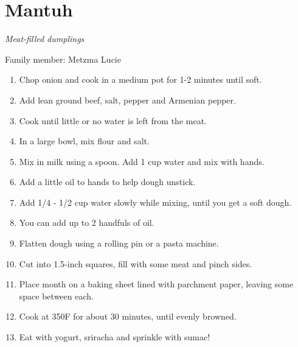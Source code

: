 \chapter{Mantuh}
\label{ch:mantuh}


\textit{Meat-filled dumplings}

Family member: Metzma Lucie

\begin{enumerate}
    \item Chop onion and cook in a medium pot for 1-2 minutes until soft.
    \item Add lean ground beef, salt, pepper and Armenian pepper.
    \item Cook until little or no water is left from the meat.

    \item In a large bowl, mix flour and salt.
    \item Mix in milk using a spoon. Add 1 cup water and mix with hands.
    \item Add a little oil to hands to help dough unstick.
    \item Add 1/4 - 1/2 cup water slowly while mixing, until you get a soft dough.
    \item You can add up to 2 handfuls of oil.

    \item Flatten dough using a rolling pin or a pasta machine.
    \item Cut into 1.5-inch squares, fill with some meat and pinch sides.
    \item Place month on a baking sheet lined with parchment paper, leaving some space between each.
    \item Cook at 350\degree F for about 30 minutes, until evenly browned.
    \item Eat with yogurt, sriracha and sprinkle with sumac!
\end{enumerate}

